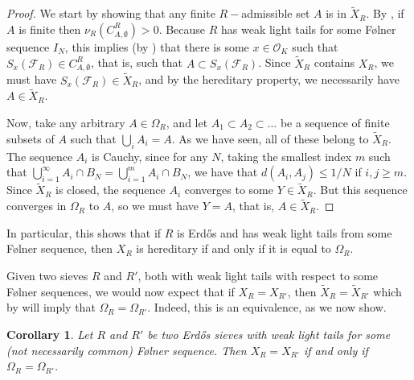 \documentclass[a4paper,11pt,reqno]{amsart}
\theoremstyle{plain}
\newtheorem{corollary}[theorem]{Corollary}
\theoremstyle{remark}
\newcommand{\co}{\mathcal{O}}
\newcommand{\fr}{\mathcal{F}_R}
\begin{document}
			\begin{proof}
				
				We start by showing that any finite $R-$admissible set $A$ is in $ \widetilde{X}_R$. By  , if $A$ is finite then $\nu_R(C^R_{A,\emptyset}) > 0$. Because $R$ has weak light tails for some Følner sequence $I_N$, this implies (by  ) that there is some $x\in \co_K$  such that $S_x(\fr) \in C^R_{A,\emptyset}$, that is, such that $A \subset S_x(\fr)  $. Since $\widetilde{X}_R$ contains $X_R$, we must have $S_x(\fr) \in \widetilde{X}_R$, and by the hereditary property, we necessarily have $A \in \widetilde{X}_R $. 
				
				Now, take any arbitrary $A \in \Omega_{R}$, and let $A_1\subset A_2\subset \dots$ be a sequence of finite subsets of $A$ such that $\bigcup_i A_i = A$. As we have seen, all of these belong to $ \widetilde{X}_R$. The sequence $A_i$ is Cauchy, since for any $N$, taking the smallest index $m$ such that $\bigcup_{i=1}^\infty A_i \cap B_N = \bigcup_{i=1}^m A_i \cap B_N$, we have that $d(A_i,A_j) \leq 1/N$ if $i,j \geq m$. Since $ \widetilde{X}_R$ is closed, the sequence $A_i$ converges to some $Y \in  \widetilde{X}_R$. But this sequence converges in $\Omega_R$ to $A$, so we must have $Y=A$, that is, $A \in \widetilde{X}_R$.
			\end{proof}
			
			In particular, this shows that if $R$ is Erdős and has weak light tails from some Følner sequence, then $X_R$ is hereditary if and only if it is equal to $\Omega_{R}$.
			
			Given two sieves $R$ and $R'$, both with weak light tails with respect to some Følner sequences, we would now expect that if $X_R = X_{R'}$, then $\widetilde{X}_R = \widetilde{X}_{R'}$ which by   will imply that $\Omega_R =\Omega_{R'}$. Indeed, this is an equivalence, as we now show. 
			
			
			
			\begin{corollary}
				\label{crl: OMEGAR= OMEGAR' AND XR = OMEGAR implies XR = XR'}
				Let $R$ and $R'$ be two Erdős sieves with weak light tails for some (not necessarily common) Følner sequence. Then $X_R = X_{R'}$ if and only if  $\Omega_R =\Omega_{R'}$.
			\end{corollary}
			
\end{document}
